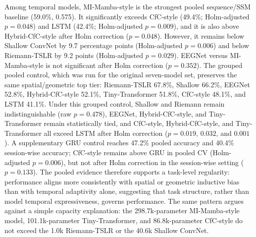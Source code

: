 \documentclass[journal]{IEEEtran}
\begin{document}
Among temporal models, MI-Mamba-style is the strongest pooled sequence/SSM baseline (59.0\%, 0.575). It significantly exceeds CfC-style (49.4\%; Holm-adjusted $p = 0.048$) and LSTM (42.4\%; Holm-adjusted $p = 0.009$), and it is also above Hybrid-CfC-style after Holm correction ($p = 0.048$). However, it remains below Shallow ConvNet by 9.7 percentage points (Holm-adjusted $p = 0.006$) and below Riemann-TSLR by 9.2 points (Holm-adjusted $p = 0.029$). EEGNet versus MI-Mamba-style is not significant after Holm correction ($p = 0.352$). The grouped pooled control, which was run for the original seven-model set, preserves the same spatial/geometric top tier: Riemann-TSLR 67.8\%, Shallow 66.2\%, EEGNet 52.8\%, Hybrid-CfC-style 52.1\%, Tiny-Transformer 51.8\%, CfC-style 48.1\%, and LSTM 41.1\%. Under this grouped control, Shallow and Riemann remain indistinguishable (raw $p = 0.478$), EEGNet, Hybrid-CfC-style, and Tiny-Transformer remain statistically tied, and CfC-style, Hybrid-CfC-style, and Tiny-Transformer all exceed LSTM after Holm correction ($p = 0.019$, $0.032$, and $0.001$). A supplementary GRU control reaches 47.2\% pooled accuracy and 40.4\% session-wise accuracy; CfC-style remains above GRU in pooled CV (Holm-adjusted $p = 0.006$), but not after Holm correction in the session-wise setting ($p = 0.133$). The pooled evidence therefore supports a task-level regularity: performance aligns more consistently with spatial or geometric inductive bias than with temporal adaptivity alone, suggesting that task structure, rather than model temporal expressiveness, governs performance. The same pattern argues against a simple capacity explanation: the 298.7k-parameter MI-Mamba-style model, 101.1k-parameter Tiny-Transformer, and 86.8k-parameter CfC-style do not exceed the 1.0k Riemann-TSLR or the 40.6k Shallow ConvNet.
\end{document}
